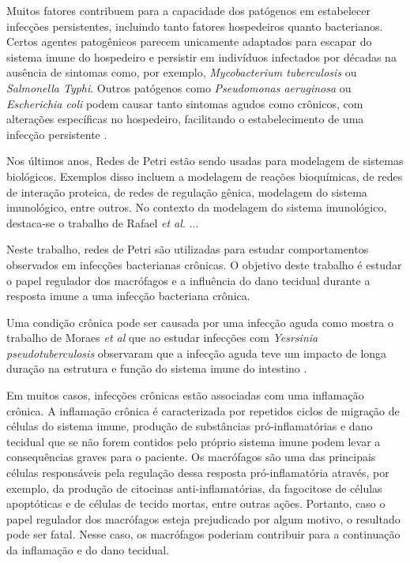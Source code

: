 \documentclass[10pt]{bmc_article}
\newenvironment{bmcformat}{\baselineskip20pt\sloppy\setboolean{publ}{false}}{\baselineskip20pt\sloppy}
\begin{document}
\begin{bmcformat}
		Muitos fatores contribuem para a capacidade dos patógenos em estabelecer infecções persistentes, incluindo tanto 
		fatores hospedeiros quanto bacterianos. Certos agentes patogênicos parecem unicamente adaptados para escapar do 
		sistema imune do hospedeiro e persistir em indivíduos infectados por décadas na ausência de sintomas como, por exemplo, 
		\textit{Mycobacterium tuberculosis} ou \textit{Salmonella Typhi}. Outros patógenos como \textit{Pseudomonas aeruginosa} 
		ou \textit{Escherichia coli} podem causar tanto sintomas agudos como crônicos, com alterações específicas no hospedeiro, 
		facilitando o estabelecimento de uma infecção persistente \cite{Grant2013}.

		Nos últimos anos, Redes de Petri estão sendo usadas para modelagem de sistemas biológicos. Exemplos disso incluem 
		a modelagem de reações bioquímicas, de redes de interação proteica, de redes de regulação gênica, 
		modelagem do sistema imunológico, entre outros. No contexto da modelagem do sistema imunológico, destaca-se o trabalho de Rafael \textit{et al.} ...
		
		Neste trabalho, redes de Petri são utilizadas para estudar comportamentos observados em infecções bacterianas crônicas. 
		O objetivo deste trabalho é estudar o papel regulador dos macrófagos e a influência do dano tecidual durante a resposta imune 
		a uma infecção bacteriana crônica. 
				
		Uma condição crônica pode ser causada por uma infecção aguda como mostra o trabalho de Moraes \textit{et al} \cite{Fonseca2015} que ao estudar infecções com 
		\textit{Yesrsinia pseudotuberculosis} observaram que a infecção aguda teve um impacto de longa duração na estrutura e função do 
		sistema imune do intestino \cite{Fonseca2015}. 
		
		Em muitos casos, infecções crônicas estão associadas com uma inflamação crônica. A inflamação crônica é caracterizada por repetidos ciclos de migração 
		de células do sistema imune, produção de substâncias pró-inflamatórias e dano tecidual que se não forem contidos pelo próprio sistema imune podem levar a 
		consequências graves para o paciente. Os macrófagos são uma das principais células responsáveis pela regulação dessa resposta pró-inflamatória através, 
		por exemplo, da produção de citocinas anti-inflamatórias, da fagocitose de células apoptóticas e de células de tecido mortas, entre outras ações. 
		Portanto, caso o papel regulador dos macrófagos esteja prejudicado por algum motivo, o resultado pode ser fatal. 
		Nesse caso, os macrófagos poderiam contribuir para a continuação da inflamação e do dano tecidual. 
		

\end{bmcformat}
\end{document}
